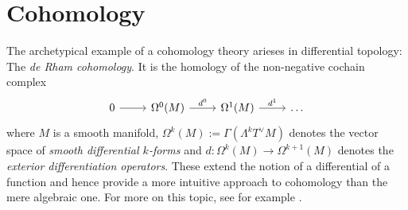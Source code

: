 \chapter{Cohomology}

The archetypical example of a cohomology theory arieses in differential topology: The \emph{de Rham cohomology}. It is the homology of the non-negative cochain complex 
\begin{equation*}
	\begin{tikzcd}
		0 \arrow[r] & \Omega^0(M) \arrow[r,"d^0"] & \Omega^1(M) \arrow[r,"d^1"] & \dots
	\end{tikzcd}
\end{equation*}
\noindent where $M$ is a smooth manifold, $\Omega^k(M) := \Gamma(\Lambda^k T^\vee M)$ denotes the vector space of \emph{smooth differential $k$-forms} and $d : \Omega^k(M) \to \Omega^{k + 1}(M)$ denotes the \emph{exterior differentiation operators}. These extend the notion of a differential of a function and hence provide a more intuitive approach to cohomology than the mere algebraic one. For more on this topic, see for example \cite{lee:smooth_manifolds:2013}.


